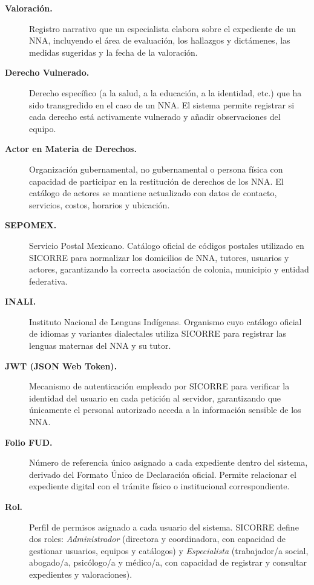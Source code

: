 \begin{description}
	\item[\textbf{Valoración.}]
	Registro narrativo que un especialista elabora sobre el expediente
	de un NNA, incluyendo el área de evaluación, los hallazgos y
	dictámenes, las medidas sugeridas y la fecha de la valoración.
	
	\item[\textbf{Derecho Vulnerado.}]
	Derecho específico (a la salud, a la educación, a la identidad,
	etc.) que ha sido transgredido en el caso de un NNA. El sistema
	permite registrar si cada derecho está activamente vulnerado y añadir
	observaciones del equipo.
	
	\item[\textbf{Actor en Materia de Derechos.}]
	Organización gubernamental, no gubernamental o persona física con
	capacidad de participar en la restitución de derechos de los NNA.
	El catálogo de actores se mantiene actualizado con datos de contacto,
	servicios, costos, horarios y ubicación.
	
	\item[\textbf{SEPOMEX.}]
	Servicio Postal Mexicano. Catálogo oficial de códigos postales
	utilizado en SICORRE para normalizar los domicilios de NNA,
	tutores, usuarios y actores, garantizando la correcta asociación de
	colonia, municipio y entidad federativa.
	
	\item[\textbf{INALI.}]
	Instituto Nacional de Lenguas Indígenas. Organismo cuyo catálogo
	oficial de idiomas y variantes dialectales utiliza SICORRE para
	registrar las lenguas maternas del NNA y su tutor.
	
	\item[\textbf{JWT (JSON Web Token).}]
	Mecanismo de autenticación empleado por SICORRE para verificar la
	identidad del usuario en cada petición al servidor, garantizando que
	únicamente el personal autorizado acceda a la información sensible
	de los NNA.
	
	\item[\textbf{Folio FUD.}]
	Número de referencia único asignado a cada expediente dentro del
	sistema, derivado del Formato Único de Declaración oficial. Permite
	relacionar el expediente digital con el trámite físico o
	institucional correspondiente.
	
	\item[\textbf{Rol.}]
	Perfil de permisos asignado a cada usuario del sistema. SICORRE
	define dos roles: \textit{Administrador} (directora y coordinadora,
	con capacidad de gestionar usuarios, equipos y catálogos) y
	\textit{Especialista} (trabajador/a social, abogado/a, psicólogo/a
	y médico/a, con capacidad de registrar y consultar expedientes y
	valoraciones).
\end{description}

